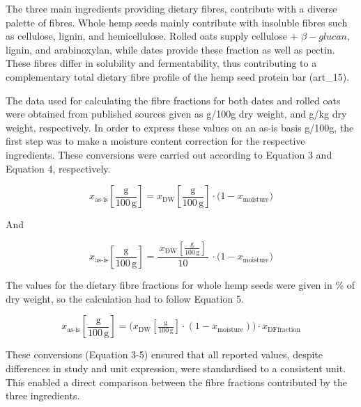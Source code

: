 \vspace{1em}
The three main ingredients providing dietary fibres, contribute with a diverse palette of fibres. Whole hemp seeds mainly contribute with insoluble fibres such as cellulose, lignin, and hemicellulose. Rolled oats supply cellulose + $\beta-glucan$, lignin, and arabinoxylan, while dates provide these fraction as well as pectin. These fibres differ in solubility and fermentability, thus contributing to a complementary total dietary fibre profile of the hemp seed protein bar (art\_15).

\vspace{1em}
The data used for calculating the fibre fractions for both dates and rolled oats were obtained from published sources given as g/100g dry weight, and g/kg dry weight, respectively. In order to express these values on an as-is basis g/100g, the first step was to make a moisture content correction for the respective ingredients. These conversions were carried out according to Equation 3 and Equation 4, respectively. 


\begin{equation}
    x_{\text{as-is}}\!\left[\frac{\mathrm{g}}{100\,\mathrm{g}}\right]
    = x_{\mathrm{DW}}\!\left[\frac{\mathrm{g}}{100\,\mathrm{g}}\right]\cdot
    \bigl(1 - x_{\text{moisture}}\bigr)
    \label{eq:asis_simple}
\end{equation}

And

\begin{equation}
    x_{\text{as-is}}\!\left[\frac{\mathrm{g}}{100\,\mathrm{g}}\right]
    = \frac{\,x_{\mathrm{DW}}\!\left[\frac{\mathrm{g}}{100\,\mathrm{g}}\right]\,}{10}\,\cdot
    \bigl(1 - x_{\text{moisture}}\bigr)
    \label{eq:asis_div10}
\end{equation}
    
The values for the dietary fibre fractions for whole hemp seeds were given in \% of dry weight, so the calculation had to follow Equation 5.     

\begin{equation}
    x_{\text{as-is}}\!\left[\frac{\mathrm{g}}{100\,\mathrm{g}}\right]
    = \bigl( x_{\mathrm{DW}}\!\left[\tfrac{\mathrm{g}}{100\,\mathrm{g}}\right]
    \cdot (1 - x_{\text{moisture}}) \bigr)
    \cdot x_{\text{DFfraction}}
    \label{eq:asis_dffraction}
    \end{equation}

    These conversions (Equation 3-5) ensured that all reported values, despite differences in study and unit expression, were standardised to a consistent unit. This enabled a direct comparison between the fibre fractions contributed by the three ingredients. 

